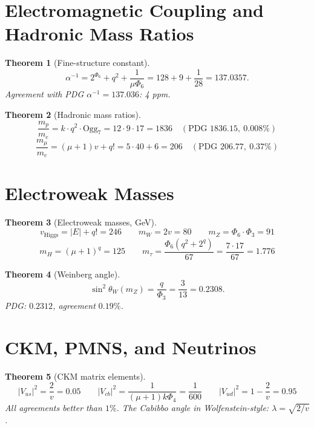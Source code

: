 \documentclass[11pt]{article}
\newtheorem{theorem}{Theorem}
\begin{document}
\section{Electromagnetic Coupling and Hadronic Mass Ratios}

\begin{theorem}[Fine-structure constant]\label{thm:alpha}
\[
  \alpha^{-1} = 2^{\Phi_6} + q^2 + \frac{1}{\mu \Phi_6}
              = 128 + 9 + \frac{1}{28}
              = 137.0357.
\]
Agreement with PDG $\alpha^{-1} = 137.036$: 4 ppm.
\end{theorem}

\begin{theorem}[Hadronic mass ratios]\label{thm:hadron_ratios}
\[
  \frac{m_p}{m_e} = k \cdot q^2 \cdot \mathrm{Ogg}_7 = 12 \cdot 9 \cdot 17 = 1836
  \quad (\text{PDG } 1836.15,\ 0.008\%)
\]
\[
  \frac{m_\mu}{m_e} = (\mu + 1) v + q! = 5 \cdot 40 + 6 = 206
  \quad (\text{PDG } 206.77,\ 0.37\%)
\]
\end{theorem}

\section{Electroweak Masses}

\begin{theorem}[Electroweak masses, GeV]\label{thm:ew_masses}
\[
  v_{\mathrm{Higgs}} = |E| + q! = 246
\qquad
  m_W = 2v = 80
\qquad
  m_Z = \Phi_6 \cdot \Phi_3 = 91
\]
\[
  m_H = (\mu + 1)^q = 125
\qquad
  m_\tau = \frac{\Phi_6 (q^2 + 2^q)}{67} = \frac{7 \cdot 17}{67} = 1.776
\]
\end{theorem}

\begin{theorem}[Weinberg angle]\label{thm:weinberg}
\[
  \sin^2\theta_W(m_Z) = \frac{q}{\Phi_3} = \frac{3}{13} = 0.2308.
\]
PDG: $0.2312$, agreement $0.19\%$.
\end{theorem}

\section{CKM, PMNS, and Neutrinos}

\begin{theorem}[CKM matrix elements]\label{thm:ckm}
\[
  |V_{us}|^2 = \frac{2}{v} = 0.05
  \qquad
  |V_{cb}|^2 = \frac{1}{(\mu+1) k \Phi_4} = \frac{1}{600}
  \qquad
  |V_{ud}|^2 = 1 - \frac{2}{v} = 0.95
\]
All agreements better than $1\%$.  The Cabibbo angle in
Wolfenstein-style: $\lambda = \sqrt{2/v}$.
\end{theorem}
\end{document}
